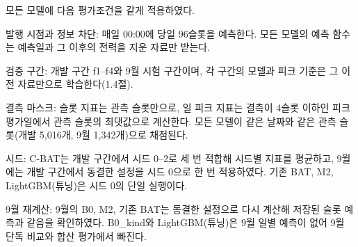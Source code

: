 모든 모델에 다음 평가조건을 같게 적용하였다.
\begin{hwplist}
\item 발행 시점과 정보 차단: 매일 00:00에 당일 96슬롯을 예측한다. 모든 모델의 예측 함수는 예측일과 그 이후의 전력을 지운 자료만 받는다.
\item 검증 구간: 개발 구간 f1--f4와 9월 시험 구간이며, 각 구간의 모델과 피크 기준은 그 이전 자료만으로 학습한다(1.4절).
\item 결측 마스크: 슬롯 지표는 관측 슬롯만으로, 일 피크 지표는 결측이 4슬롯 이하인 피크 평가일에서 관측 슬롯의 최댓값으로 계산한다. 모든 모델이 같은 날짜와 같은 관측 슬롯(개발 5,016개, 9월 1,342개)으로 채점된다.
\item 시드: C-BAT는 개발 구간에서 시드 0--2로 세 번 적합해 시드별 지표를 평균하고, 9월에는 개발 구간에서 동결한 설정을 시드 0으로 한 번 적용하였다. 기존 BAT, M2, LightGBM(튜닝)은 시드 0의 단일 실행이다.
\item 9월 재계산: 9월의 B0, M2, 기존 BAT는 동결한 설정으로 다시 계산해 저장된 슬롯 예측과 같음을 확인하였다. B0\_kind와 LightGBM(튜닝)은 9월 일별 예측이 없어 9월 단독 비교와 합산 평가에서 빠진다.
\end{hwplist}

